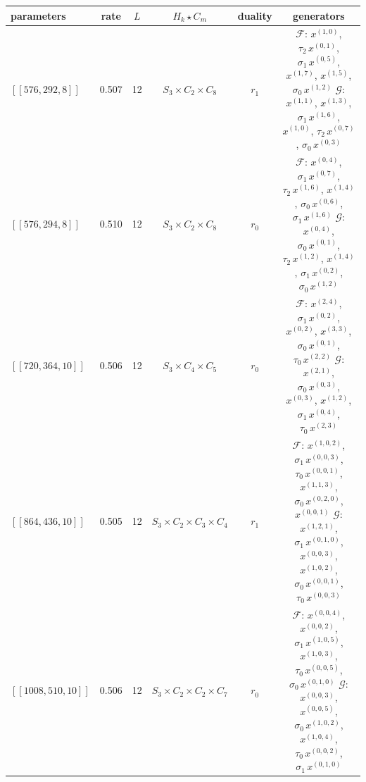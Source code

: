 \begin{table}[t]
\centering
\scriptsize\linespread{1.35}\selectfont
\begin{tabular}{lccccc}
\toprule
parameters & rate & $L$ & $H_k\star C_m$ & duality & generators \\
\midrule
$[[576, 292, 8]]$ & 0.507 & 12 & $S_{3} \times C_{2}\!\times\!C_{8}$ & $r_1^{}$ & \parbox[t]{0.46\textwidth}{\raggedright $\mathcal{F}$: $x^{(1,0)}$, $\tau_2\,x^{(0,1)}$, $\sigma_1\,x^{(0,5)}$, $x^{(1,7)}$, $x^{(1,5)}$, $\sigma_0\,x^{(1,2)}$ \\ $\mathcal{G}$: $x^{(1,1)}$, $x^{(1,3)}$, $\sigma_1\,x^{(1,6)}$, $x^{(1,0)}$, $\tau_2\,x^{(0,7)}$, $\sigma_0\,x^{(0,3)}$} \\
$[[576, 294, 8]]$ & 0.510 & 12 & $S_{3} \times C_{2}\!\times\!C_{8}$ & $r_0^{}$ & \parbox[t]{0.46\textwidth}{\raggedright $\mathcal{F}$: $x^{(0,4)}$, $\sigma_1\,x^{(0,7)}$, $\tau_2\,x^{(1,6)}$, $x^{(1,4)}$, $\sigma_0\,x^{(0,6)}$, $\sigma_1\,x^{(1,6)}$ \\ $\mathcal{G}$: $x^{(0,4)}$, $\sigma_0\,x^{(0,1)}$, $\tau_2\,x^{(1,2)}$, $x^{(1,4)}$, $\sigma_1\,x^{(0,2)}$, $\sigma_0\,x^{(1,2)}$} \\
$[[720, 364, 10]]$ & 0.506 & 12 & $S_{3} \times C_{4}\!\times\!C_{5}$ & $r_0^{}$ & \parbox[t]{0.46\textwidth}{\raggedright $\mathcal{F}$: $x^{(2,4)}$, $\sigma_1\,x^{(0,2)}$, $x^{(0,2)}$, $x^{(3,3)}$, $\sigma_0\,x^{(0,1)}$, $\tau_0\,x^{(2,2)}$ \\ $\mathcal{G}$: $x^{(2,1)}$, $\sigma_0\,x^{(0,3)}$, $x^{(0,3)}$, $x^{(1,2)}$, $\sigma_1\,x^{(0,4)}$, $\tau_0\,x^{(2,3)}$} \\
$[[864, 436, 10]]$ & 0.505 & 12 & $S_{3} \times C_{2}\!\times\!C_{3}\!\times\!C_{4}$ & $r_1^{}$ & \parbox[t]{0.46\textwidth}{\raggedright $\mathcal{F}$: $x^{(1,0,2)}$, $\sigma_1\,x^{(0,0,3)}$, $\tau_0\,x^{(0,0,1)}$, $x^{(1,1,3)}$, $\sigma_0\,x^{(0,2,0)}$, $x^{(0,0,1)}$ \\ $\mathcal{G}$: $x^{(1,2,1)}$, $\sigma_1\,x^{(0,1,0)}$, $x^{(0,0,3)}$, $x^{(1,0,2)}$, $\sigma_0\,x^{(0,0,1)}$, $\tau_0\,x^{(0,0,3)}$} \\
$[[1008, 510, 10]]$ & 0.506 & 12 & $S_{3} \times C_{2}\!\times\!C_{2}\!\times\!C_{7}$ & $r_0^{}$ & \parbox[t]{0.46\textwidth}{\raggedright $\mathcal{F}$: $x^{(0,0,4)}$, $x^{(0,0,2)}$, $\sigma_1\,x^{(1,0,5)}$, $x^{(1,0,3)}$, $\tau_0\,x^{(0,0,5)}$, $\sigma_0\,x^{(0,1,0)}$ \\ $\mathcal{G}$: $x^{(0,0,3)}$, $x^{(0,0,5)}$, $\sigma_0\,x^{(1,0,2)}$, $x^{(1,0,4)}$, $\tau_0\,x^{(0,0,2)}$, $\sigma_1\,x^{(0,1,0)}$} \\

\end{tabular}
\end{table}
